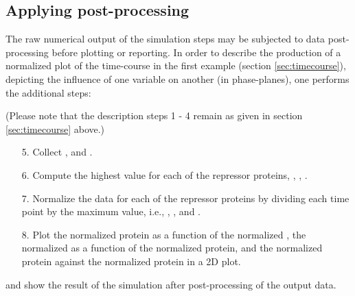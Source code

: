 \subsection{Applying post-processing}
\label{sec:postprocessing}
The raw numerical output of the simulation steps may be subjected to data post-processing before plotting or reporting. In order to describe the production of a normalized plot of the time-course in the first example (section \ref{sec:timecourse}), depicting the influence of one variable on another (in phase-planes), one performs the additional steps:

(Please note that the description steps 1 - 4 remain as given in section \ref{sec:timecourse} above.)
\begin{enumerate}
	\item[5.]{Collect ,  and .}
	\item[6.]{Compute the highest value for each of the repressor proteins, , , .}
	\item[7.]{Normalize the data for each of the repressor proteins by dividing each time point by the maximum value, i.e., , , and .}
	\item[8.]{Plot the normalized  protein as a function of the normalized , the normalized  as a function of the normalized  protein, and the normalized  protein against the normalized  protein in a 2D plot.}
\end{enumerate}

 and  show the result of the simulation after post-processing of the output data. 


